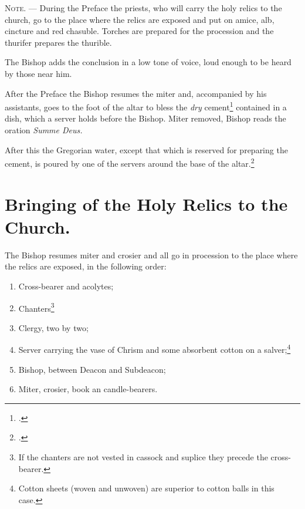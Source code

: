 \documentclass[letterpaper]{report}
\begin{document}
{    \textsc{Note. ---} During the Preface the priests, who will carry the holy
    relics to the church, go to the place where the relics are exposed and put
    on amice, alb, cincture and red chasuble. Torches are prepared for the
    procession and the thurifer prepares the thurible.

    The Bishop adds the conclusion in a low tone of voice, loud enough to be
    heard by those near him.

    \rubric After the Preface the Bishop resumes the miter and, accompanied by
    his assistants, goes to the foot of the altar to bless the \textit{dry}
    cement\footcite[The Pontifical prescribes that he should first mix the
    cement with the water which he previously blessed and then bless the
    mixture. This is not feasible and consequently it is better to keep
    sufficient amount of water in a separate vessel to be poured over the dry
    cement shortly before it is to be used for closing the
    sepulcher.][footnote, p. 77.]{consecranda} contained in a dish, which a
    server holds before the Bishop. Miter removed, Bishop reads the oration
    \textit{Summe Deus.}

    \rubric After this the Gregorian water, except that which is reserved for
    preparing the cement, is poured by one of the servers around the base of
    the altar.\footcite[If much water remains only a small quantity of it is
    poured around the base of the altar, and what is left is afterwards poured
    into the \textit{secrarium.}][footnote 1, p. 78.]{consecranda}

    \section{Bringing of the Holy Relics to the Church.}

    \rubric The Bishop resumes miter and crosier and all go in procession to
    the place where the relics are exposed, in the following order:

    \begin{enumerate}
        \item Cross-bearer and acolytes;
        \item Chanters\footnote{If the chanters are not vested in cassock and
            suplice they precede the cross-bearer.}
        \item Clergy, two by two;
        \item Server carrying the vase of Chrism and some absorbent cotton on a
            salver;\footnote{Cotton sheets (woven and unwoven) are superior to
            cotton balls in this case.}
        \item Bishop, between Deacon and Subdeacon;
        \item Miter, crosier, book an candle-bearers.
    \end{enumerate}

}
\end{document}
